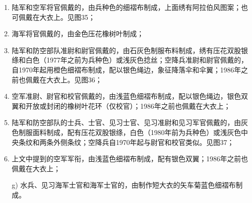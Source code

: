 \begin{enumerate}

    \item 陆军和空军将官佩戴的，由兵种色的细褶布制成，上面绣有阿拉伯风图案；也可佩戴在大衣上。见图35；

    \item 海军将官佩戴的，由金色压花橡树叶制成；

    \item 陆军和防空部队准尉和尉官佩戴的，由石灰色制服布料制成，绣有压花双股银绦和白色（1977年之前为兵种色）或浅灰色捻丝；空降兵准尉和尉官佩戴的，自1970年起用橙色细褶布制成，配以银色绳边，象征降落伞和伞翼；1986年之前也佩戴在大衣上。见图36；

    \item 空军准尉、尉官和校官佩戴的，由浅蓝色细褶布制成，配以银色绳边，银色双翼和开放或封闭的橡树叶花环（仅校官）；1986年之前也佩戴在大衣上；

    \item 陆军和防空部队的士兵、士官、见习士官、见习准尉和见习军官佩戴的，由灰色制服面料制成，配有压花双股银绦，白色（1980年前为兵种色）或浅灰色中央条纹和两条外侧条纹；空降兵自1970年起与尉官和校官类似。见图37；

    \item 上文中提到的空军军衔，由浅蓝色细褶布制成，配有银色双翼；1986年之前也佩戴在大衣上；

    g) 水兵、见习海军士官和海军士官的，由制作短大衣的矢车菊蓝色细褶布制成。

\end{enumerate}


